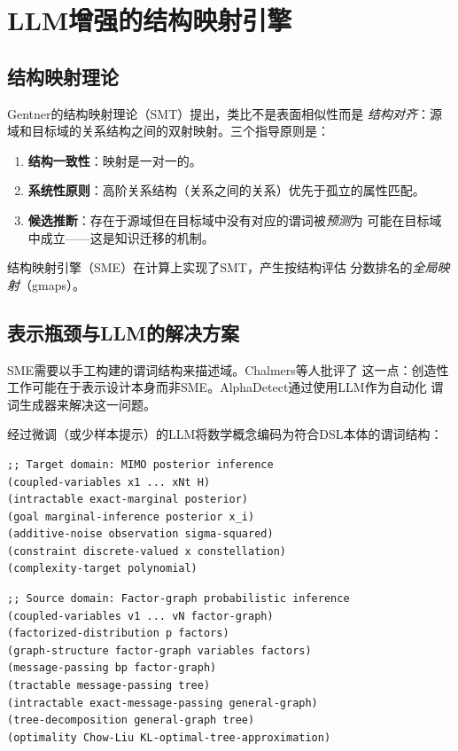 \documentclass[12pt,a4paper]{article}
\begin{document}
\section{LLM增强的结构映射引擎}
\label{sec:sme}

\subsection{结构映射理论}

Gentner的结构映射理论（SMT）\cite{gentner1983}提出，类比不是表面相似性而是
\emph{结构对齐}：源域和目标域的关系结构之间的双射映射。三个指导原则是：

\begin{enumerate}[leftmargin=2em, itemsep=2pt]
  \item \textbf{结构一致性}：映射是一对一的。
  \item \textbf{系统性原则}：高阶关系结构（关系之间的关系）优先于孤立的属性匹配。
  \item \textbf{候选推断}：存在于源域但在目标域中没有对应的谓词被\emph{预测}为
        可能在目标域中成立——这是知识迁移的机制。
\end{enumerate}

\noindent
结构映射引擎（SME）\cite{falkenhainer1989}在计算上实现了SMT，产生按结构评估
分数排名的\emph{全局映射}（gmaps）。

\subsection{表示瓶颈与LLM的解决方案}

SME需要以手工构建的谓词结构来描述域。Chalmers等人\cite{chalmers1992}批评了
这一点：创造性工作可能在于表示设计本身而非SME。AlphaDetect通过使用LLM作为自动化
谓词生成器来解决这一问题。

经过微调（或少样本提示）的LLM将数学概念编码为符合DSL本体的谓词结构：

\vspace{0.3em}
\begin{lstlisting}[style=dsl, caption={LLM生成的MIMO后验推断问题的谓词编码}]
;; Target domain: MIMO posterior inference
(coupled-variables x1 ... xNt H)
(intractable exact-marginal posterior)
(goal marginal-inference posterior x_i)
(additive-noise observation sigma-squared)
(constraint discrete-valued x constellation)
(complexity-target polynomial)
\end{lstlisting}

\begin{lstlisting}[style=dsl, caption={LLM生成的因子图推断的谓词编码（源域）}]
;; Source domain: Factor-graph probabilistic inference
(coupled-variables v1 ... vN factor-graph)
(factorized-distribution p factors)
(graph-structure factor-graph variables factors)
(message-passing bp factor-graph)
(tractable message-passing tree)
(intractable exact-message-passing general-graph)
(tree-decomposition general-graph tree)
(optimality Chow-Liu KL-optimal-tree-approximation)
\end{lstlisting}
\end{document}

